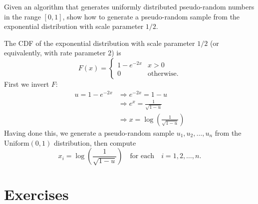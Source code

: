 \begin{example}
Given an algorithm that generates uniformly distributed pseudo-random numbers in the range $[0,1]$, show how to generate a pseudo-random sample from the exponential distribution with scale parameter $1/2$.
\end{example}
\begin{solution}
The CDF of the exponential distribution with scale parameter $1/2$ (or equivalently, with rate parameter $2$) is 
\[
F(x) = \begin{cases}
	1 - e^{-2x}	& x>0 \\
	0			& \text{otherwise.}
\end{cases}	
\]
First we invert $F$:
\begin{align*}
u = 1 - e^{-2x} 
	& \Rightarrow e^{-2x} = 1-u \\
	& \Rightarrow e^x = \frac{1}{\sqrt{1-u}} \\
	& \Rightarrow x = \log\left(\frac{1}{\sqrt{1-u}}\right)
\end{align*}
Having done this, we generate a pseudo-random sample $u_1,u_2,\ldots,u_n$ from the $\text{Uniform}(0,1)$ distribution, then compute 
\[
x_i = \log\left(\frac{1}{\sqrt{1-u}}\right)\quad\text{for each}\quad i=1,2,\ldots,n.
\]
\end{solution}

\section{Exercises}


\endinput

